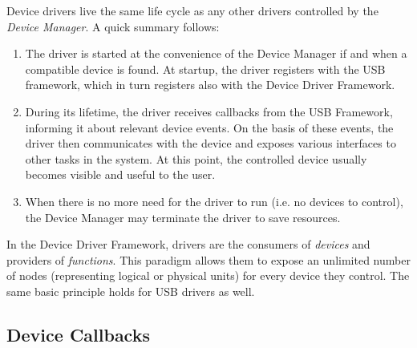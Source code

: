 Device drivers live the same life cycle as any other drivers controlled by the
\textit{Device Manager}. A quick summary follows:
%
\begin{enumerate}
	\item The driver is started at the convenience of the Device Manager if and
	when a compatible device is found. At startup, the driver registers with the
	USB framework, which in turn registers also with the Device Driver
	Framework.

	\item During its lifetime, the driver receives callbacks from the USB
	Framework, informing it about relevant device events. On the basis of these
	events, the driver then communicates with the device and exposes various
	interfaces to other tasks in the system. At this point, the controlled
	device usually becomes visible and useful to the user.

	\item When there is no more need for the driver to run (i.e. no devices to
	control), the Device Manager may terminate the driver to save resources.
\end{enumerate}

In the Device Driver Framework, drivers are the consumers of \textit{devices}
and providers of \textit{functions}. This paradigm allows them to expose an
unlimited number of nodes (representing logical or physical units) for every
device they control. The same basic principle holds for USB drivers as well.


\subsection{Device Callbacks}

